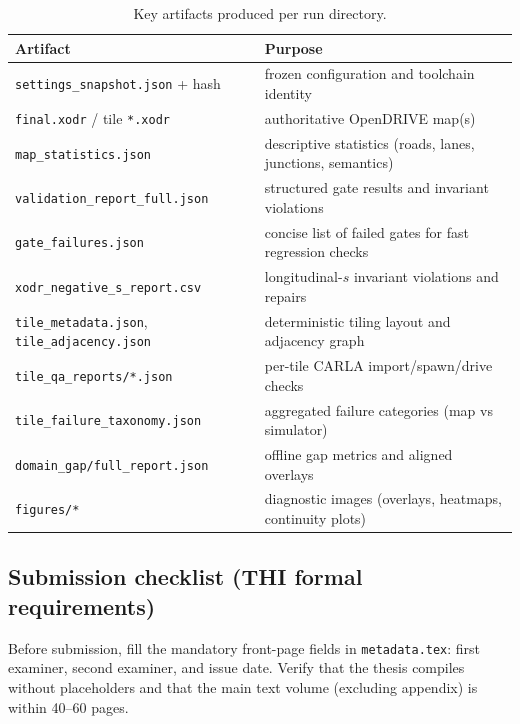 \begin{table}[ht]
\centering
\caption{Key artifacts produced per run directory.}
\label{tab:artifact_inventory}
\begin{tabular}{ll}
\toprule
Artifact & Purpose \\
\midrule
\texttt{settings\_snapshot.json} + hash & frozen configuration and toolchain identity \\
\texttt{final.xodr} / tile \texttt{*.xodr} & authoritative OpenDRIVE map(s) \\
\texttt{map\_statistics.json} & descriptive statistics (roads, lanes, junctions, semantics) \\
\texttt{validation\_report\_full.json} & structured gate results and invariant violations \\
\texttt{gate\_failures.json} & concise list of failed gates for fast regression checks \\
\texttt{xodr\_negative\_s\_report.csv} & longitudinal-$s$ invariant violations and repairs \\
\texttt{tile\_metadata.json}, \texttt{tile\_adjacency.json} & deterministic tiling layout and adjacency graph \\
\texttt{tile\_qa\_reports/*.json} & per-tile CARLA import/spawn/drive checks \\
\texttt{tile\_failure\_taxonomy.json} & aggregated failure categories (map vs simulator) \\
\texttt{domain\_gap/full\_report.json} & offline gap metrics and aligned overlays \\
\texttt{figures/*} & diagnostic images (overlays, heatmaps, continuity plots) \\
\bottomrule
\end{tabular}
\end{table}

\subsection{Submission checklist (THI formal requirements)}
\label{sec:appendix_checklist}
Before submission, fill the mandatory front-page fields in \texttt{metadata.tex}: first examiner, second examiner, and issue date. 
Verify that the thesis compiles without placeholders and that the main text volume (excluding appendix) is within 40--60 pages.
